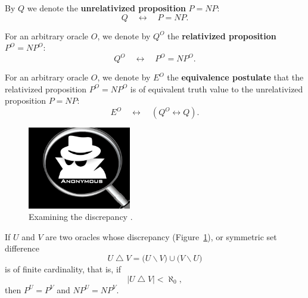 \documentclass[letterpaper]{article}
\begin{document}
\begin{construction}\label{oq}
	By $Q$ we denote the \textbf{unrelativized proposition} \mbox{$P=NP$}:
\begin{equation}
Q\quad\longleftrightarrow\quad P=NP.
\end{equation}
\end{construction}
\begin{construction}\label{oqo}
For an arbitrary oracle $O$, we denote by $Q^O$ the \textbf{relativized proposition} \mbox{$P^O=NP^O$}:
\begin{equation}
Q^O\quad\longleftrightarrow\quad P^O=NP^O.
\end{equation}
\end{construction}
\begin{construction}\label{oeo}
	For an arbitrary oracle $O$, we denote by $E^O$ the \textbf{equivalence postulate} that the relativized proposition $P^O=NP^O$ is of equivalent truth value to the unrelativized proposition $P=NP$:
	\begin{equation}
	 E^O\quad\longleftrightarrow\quad (Q^O\longleftrightarrow Q).
	\end{equation}
\end{construction}
\begin{lemma}
\label{lemmadelta}
\begin{figure}
	\centering
	\includegraphics[width=0.40\textwidth]{Anonymous.png}
	\caption[Examining the discrepancy]{Examining the discrepancy \cite{akshayhallur2014}.}\label{figdiscrepancy}
\end{figure}
If $U$ and $V$ are two oracles whose discrepancy (Figure~\ref{figdiscrepancy}), or symmetric set difference
\begin{equation}
U\operatorname{\triangle} V=\big(U\operatorname\backslash V\big)\cup\big(V\operatorname\backslash U\big)
\end{equation}
is of finite cardinality, that is, if
\begin{equation}
\left|U\operatorname{\triangle} V\right|<\aleph_0,
\end{equation}
then $P^U=P^V$ and $NP^U=NP^V$.
\end{lemma}
\end{document}

